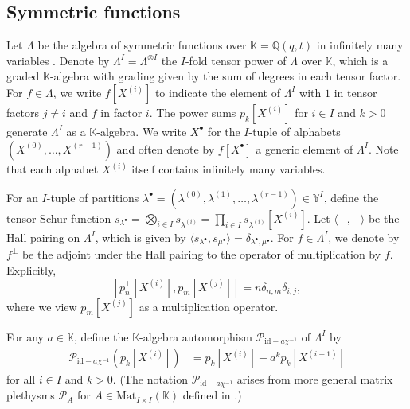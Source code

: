 \documentclass{amsart}
\newcommand{\Q}{\mathbb{Q}}
\newcommand{\K}{\mathbb{K}}
\newcommand{\Y}{\mathbb{Y}}
\newcommand{\cP}{\mathcal{P}}
\newcommand{\La}{\Lambda}
\newcommand{\la}{\lambda}
\newcommand{\lad}{{\lambda^\bullet}}
\newcommand{\mud}{{\mu^\bullet}}
\newcommand{\Xd}{X^\bullet}
\newcommand{\id}{\mathrm{id}}
\theoremstyle{remark}
\numberwithin{thm}{section}
\numberwithin{equation}{section}
\begin{document}
\subsection{Symmetric functions}
Let $\La$ be the algebra of symmetric functions over $\K=\Q(q,t)$ in infinitely many variables \cite[\S I.2]{Mac}.
Denote by $\La^{I}=\La^{\otimes I}$ the $I$-fold tensor power of $\La$ over $\K$, which is a graded $\K$-algebra with grading given by the sum of degrees in each tensor factor. 
For $f\in \La$, we write $f[X^{(i)}]$ to indicate the element of $\La^I$ with $1$ in tensor factors $j\ne i$ and $f$ in factor $i$. 
The power sums $p_k[X^{(i)}]$ for $i\in I$ and $k>0$ generate $\Lambda^I$ as a $\K$-algebra. We write $\Xd$ for the $I$-tuple of alphabets $(X^{(0)},\dotsc,X^{(r-1)})$ and often denote by $f[\Xd]$ a generic element of $\Lambda^I$.
Note that each alphabet $X^{(i)}$ itself contains infinitely many variables.

For an $I$-tuple of partitions $\lad=(\la^{(0)},\la^{(1)},\dotsc,\la^{(r-1)})\in \Y^I$, define the tensor Schur function $s_\lad=\bigotimes_{i\in I} s_{\la^{(i)}}=\prod_{i\in I} s_{\la^{(i)}}[X^{(i)}]$. Let $\langle-,-\rangle$ be the Hall pairing on $\Lambda^I$, which is given by $\langle s_\lad, s_\mud \rangle = \delta_{\lad,\mud}$. For $f\in\Lambda^I$, we denote by $f^\perp$ be the adjoint under the Hall pairing to the operator of multiplication by $f$.
Explicitly,
\[
\left[p_n^\perp[X^{(i)}], p_m[X^{(j)}]\right]=n\delta_{n,m}\delta_{i,j},
\]
where we view $p_m[X^{(j)}]$ as a multiplication operator.

For any $a\in\K$, define the $\K$-algebra automorphism $\cP_{\id-a\chi^{-1}}$ of $\Lambda^I$ by
\begin{align}
\cP_{\id-a\chi^{-1}}(p_k[X^{(i)}]) &= p_k[X^{(i)}]-a^{k}p_k[X^{(i-1)}]
\end{align}
for all $i\in I$ and $k>0$. (The notation $\cP_{\id-a\chi^{-1}}$ arises from more general matrix plethysms $\cP_A$ for $A\in\mathrm{Mat}_{I\times I}(\K)$ defined in \cite{OS2}.)
\end{document}
